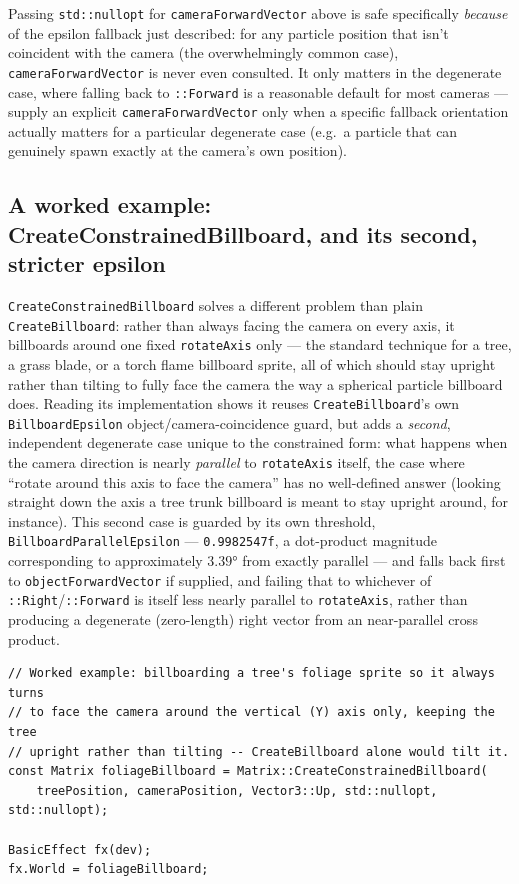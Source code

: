 Passing \texttt{std::nullopt} for \texttt{cameraForwardVector} above is safe specifically
\emph{because} of the epsilon fallback just described: for any particle position that isn't
coincident with the camera (the overwhelmingly common case), \texttt{cameraForwardVector} is
never even consulted. It only matters in the degenerate case, where falling back to
\texttt{::Forward} is a reasonable default for most cameras --- supply an
explicit \texttt{cameraForwardVector} only when a specific fallback orientation actually
matters for a particular degenerate case (e.g.\ a particle that can genuinely spawn exactly at
the camera's own position).

\subsection{A worked example: CreateConstrainedBillboard, and its second, stricter epsilon}

\texttt{CreateConstrainedBillboard} solves a different problem than plain
\texttt{CreateBillboard}: rather than always facing the camera on every axis, it billboards
around one fixed \texttt{rotateAxis} only --- the standard technique for a tree, a grass
blade, or a torch flame billboard sprite, all of which should stay upright rather than tilting
to fully face the camera the way a spherical particle billboard does. Reading its
implementation shows it reuses \texttt{CreateBillboard}'s own \texttt{BillboardEpsilon}
object/camera-coincidence guard, but adds a \emph{second}, independent degenerate case unique
to the constrained form: what happens when the camera direction is nearly \emph{parallel} to
\texttt{rotateAxis} itself, the case where ``rotate around this axis to face the camera'' has
no well-defined answer (looking straight down the axis a tree trunk billboard is meant to
stay upright around, for instance). This second case is guarded by its own threshold,
\texttt{BillboardParallelEpsilon} --- \texttt{0.9982547f}, a dot-product magnitude corresponding
to approximately $3.39°$ from exactly parallel --- and falls back first to
\texttt{objectForwardVector} if supplied, and failing that to whichever of
\texttt{::Right}/\texttt{::Forward} is itself less nearly parallel to
\texttt{rotateAxis}, rather than producing a degenerate (zero-length) right vector from an
near-parallel cross product.

\begin{lstlisting}
// Worked example: billboarding a tree's foliage sprite so it always turns
// to face the camera around the vertical (Y) axis only, keeping the tree
// upright rather than tilting -- CreateBillboard alone would tilt it.
const Matrix foliageBillboard = Matrix::CreateConstrainedBillboard(
    treePosition, cameraPosition, Vector3::Up, std::nullopt, std::nullopt);

BasicEffect fx(dev);
fx.World = foliageBillboard;
\end{lstlisting}

